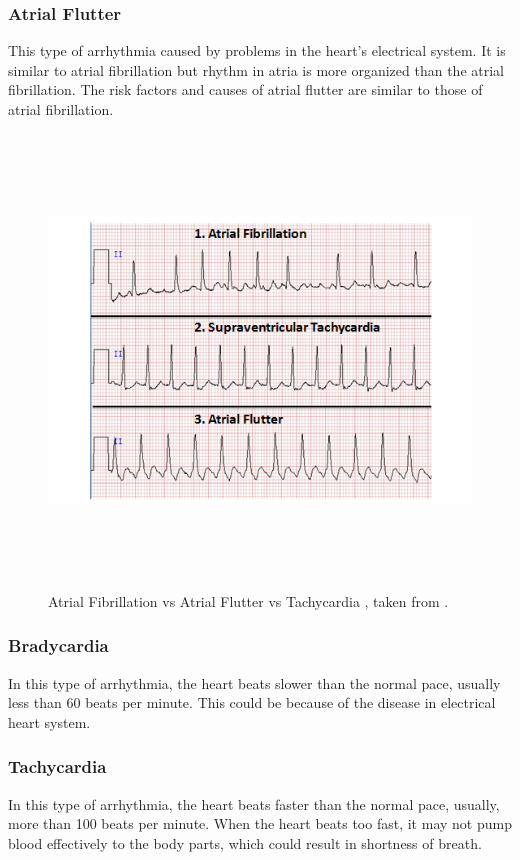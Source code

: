 \subsubsection{Atrial Flutter}
This type of arrhythmia caused by problems in the heart's electrical system. It is similar to atrial fibrillation but rhythm in atria is more organized than the atrial fibrillation. The risk factors and causes of atrial flutter are similar to those of atrial fibrillation.

\begin{figure}[htpb]
	\centering
	\includegraphics[width=15cm,height=12cm,keepaspectratio=true]{images/af}
	\caption{
		Atrial Fibrillation vs Atrial Flutter vs Tachycardia , taken from \cite{sumdu}.
	}
	\label{fig:af}
\end{figure}


\subsubsection{Bradycardia}
In this type of arrhythmia, the heart beats slower than the normal pace, usually less than 60 beats per minute. This could be because of the disease in electrical heart system.

\subsubsection{Tachycardia}
In this type of arrhythmia, the heart beats faster than the normal pace, usually, more than 100 beats per minute. When the heart beats too fast, it may not pump blood effectively to the body parts, which could result in shortness of breath.

